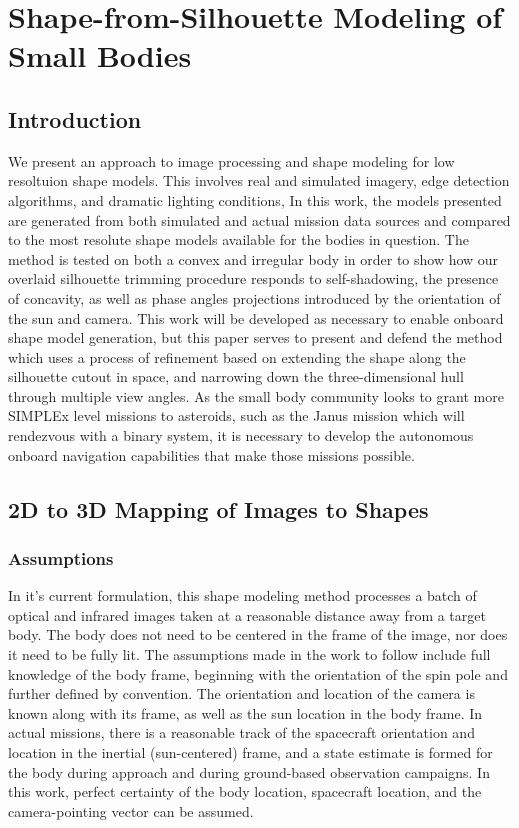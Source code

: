 \chapter{Shape-from-Silhouette Modeling of Small Bodies}
\label{shape_modeling}
\section{Introduction}
We present an approach to image processing and shape modeling for low resoltuion shape models. This involves real and simulated imagery, edge detection algorithms, and dramatic lighting conditions, 
In this work, the models presented are generated from both simulated and actual mission data sources and compared to the most resolute shape models available for the bodies in question. The method is tested on both a convex and irregular body in order to show how our overlaid silhouette trimming procedure responds to self-shadowing, the presence of concavity, as well as phase angles  projections introduced by the orientation of the sun and camera. This work will be developed as necessary to enable onboard shape model generation, but this paper serves to present and defend the method which uses a process of refinement based on extending the shape along the silhouette cutout in space, and narrowing down the three-dimensional hull through multiple view angles. As the small body community looks to grant more SIMPLEx level missions to asteroids, such as the Janus mission which will rendezvous with a binary system, it is necessary to develop the autonomous onboard navigation capabilities that make those missions possible. 

\section{2D to 3D Mapping of Images to Shapes}
\subsection{Assumptions} 
In it's current formulation, this shape modeling method processes a batch of optical and infrared images taken at a reasonable distance away from a target body. The body does not need to be centered in the frame of the image, nor does it need to be fully lit. The assumptions made in the work to follow include full knowledge of the body frame, beginning with the orientation of the spin pole and further defined by convention. The orientation and location of the camera is known along with its frame, as well as the sun location in the body frame. In actual missions, there is a reasonable track of the spacecraft orientation and location in the inertial (sun-centered) frame, and a state estimate is formed for the body during approach and during ground-based observation campaigns. In this work, perfect certainty of the body location, spacecraft location, and the camera-pointing vector can be assumed.    

